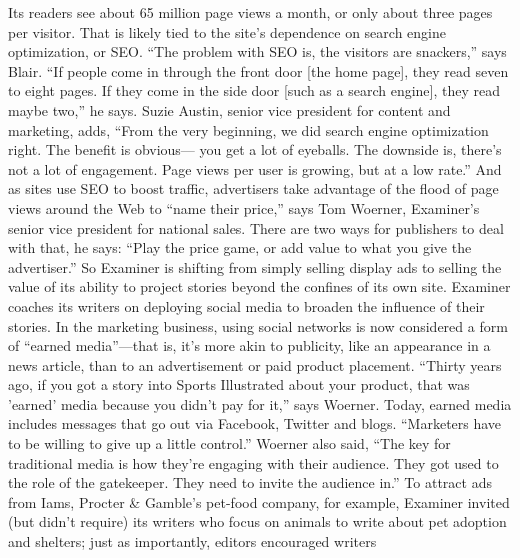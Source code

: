 Its readers see about 65 million page views a month, or only about three pages
per visitor. That is likely tied to the site's dependence on search engine optimization,
or SEO.
``The problem with SEO is, the visitors are snackers,'' says Blair. ``If people
come in through the front door [the home page], they read seven to eight pages.
If they come in the side door [such as a search engine], they read maybe two,'' he
says. Suzie Austin, senior vice president for content and marketing, adds, ``From
the very beginning, we did search engine optimization right. The benefit is obvious—
you get a lot of eyeballs. The downside is, there's not a lot of engagement.
Page views per user is growing, but at a low rate.'' And as sites use SEO to boost
traffic, advertisers take advantage of the flood of page views around the Web to
``name their price,'' says Tom Woerner, Examiner's senior vice president for national
sales. There are two ways for publishers to deal with that, he says: ``Play the
price game, or add value to what you give the advertiser.''
So Examiner is shifting from simply selling display ads to selling the value of its
ability to project stories beyond the confines of its own site. Examiner coaches its
writers on deploying social media to broaden the influence of their stories. In the
marketing business, using social networks is now considered a form of ``earned
media''—that is, it's more akin to publicity, like an appearance in a news article,
than to an advertisement or paid product placement. ``Thirty years ago, if you got
a story into Sports Illustrated about your product, that was 'earned' media because
you didn't pay for it,'' says Woerner. Today, earned media includes messages
that go out via Facebook, Twitter and blogs. ``Marketers have to be willing to
give up a little control.'' Woerner also said, ``The key for traditional media is how
they're engaging with their audience. They got used to the role of the gatekeeper.
They need to invite the audience in.''
To attract ads from Iams, Procter & Gamble's pet-food company, for example,
Examiner invited (but didn't require) its writers who focus on animals to write
about pet adoption and shelters; just as importantly, editors encouraged writers

